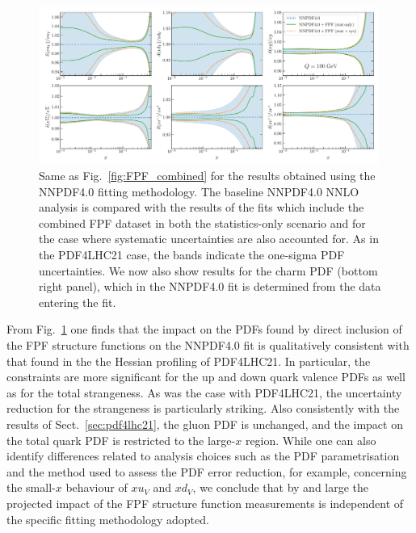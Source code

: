 \begin{figure}[t]
\centering
\includegraphics[width=0.99\textwidth]{plots/NNPDF40-FPFall-q100gev.pdf}
\caption{
  Same as Fig.~\ref{fig:FPF_combined} for the results obtained
  using the NNPDF4.0 fitting methodology.
  The baseline NNPDF4.0 NNLO analysis is compared
  with the results of the fits which include the combined FPF dataset
  in both the statistics-only scenario and for the case
  where systematic uncertainties are also accounted for.
  As in the PDF4LHC21 case, the bands indicate the one-sigma PDF uncertainties.
  We now also show results for the charm PDF (bottom right panel), which
  in the NNPDF4.0 fit is determined from the data entering the fit.
%
}
\label{fig:NNPDF40_baseline}
\end{figure}

From  Fig.~\ref{fig:NNPDF40_baseline} one finds that
the impact on the PDFs found by direct inclusion of the FPF structure
functions on the NNPDF4.0 fit is qualitatively consistent with
that found in the the Hessian profiling of PDF4LHC21.
%
In particular, the constraints are more significant for the up and down
quark valence PDFs as well as for the total strangeness.
%
As was the case with PDF4LHC21, the uncertainty reduction
for the strangeness is particularly striking.
%
Also consistently with the results of Sect.~\ref{sec:pdf4lhc21}, the gluon
PDF is unchanged, and the impact on the total quark PDF
is restricted to the large-$x$ region.
%
While one can also identify differences related to analysis choices
such as the PDF parametrisation and the method used to assess the PDF
error reduction, for example, concerning the small-$x$ behaviour of $xu_V$ and $xd_V$,
we conclude that by and large the projected impact of the FPF structure function
measurements is independent of the specific fitting methodology adopted.

